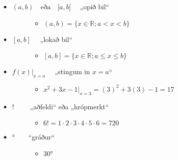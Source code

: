 \documentclass[a4paper,10pt,icelandic]{sphinxmanual}
\begin{document}
\begin{itemize}
\begin{description}
\begin{itemize}
\end{itemize}

\end{description}

\item {} \begin{description}
\item[{\((a,b) \quad \text{eða} \quad ]a,b[ \quad\) „opið bil“}] \leavevmode\begin{itemize}
\item {} 
\((a,b)=\{x\in \mathbb{R}; a<x<b\}\)

\end{itemize}

\end{description}

\item {} \begin{description}
\item[{\([a,b] \quad\) „lokað bil“}] \leavevmode\begin{itemize}
\item {} 
\([a,b]=\{x\in \mathbb{R}; a\leq x\leq b\}\)

\end{itemize}

\end{description}

\item {} \begin{description}
\item[{\(f(x)|_{x=a} \quad\) „stingum in \(x=a\)“}] \leavevmode\begin{itemize}
\item {} 
\(x^2+3x-1|_{x=3} = (3)^2+3(3)-1 = 17\)

\end{itemize}

\end{description}

\item {} \begin{description}
\item[{\(! \qquad\) „aðfeldi“ eða „hrópmerkt“}] \leavevmode\begin{itemize}
\item {} 
\(6! = 1 \cdot 2\cdot 3\cdot 4 \cdot 5 \cdot 6 =720\)

\end{itemize}

\end{description}

\item {} \begin{description}
\item[{\(°  \qquad\)“gráður“}] \leavevmode\begin{itemize}
\item {} 
\(30°\)


\end{itemize}
\end{description}
\end{itemize}
\end{document}
